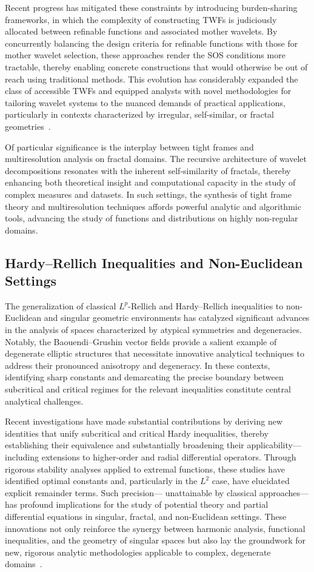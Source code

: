 \documentclass[sigconf]{acmart}
\begin{document}
Recent progress has mitigated these constraints by introducing burden-sharing frameworks, in which the complexity of constructing TWFs is judiciously allocated between refinable functions and associated mother wavelets. By concurrently balancing the design criteria for refinable functions with those for mother wavelet selection, these approaches render the SOS conditions more tractable, thereby enabling concrete constructions that would otherwise be out of reach using traditional methods. This evolution has considerably expanded the class of accessible TWFs and equipped analysts with novel methodologies for tailoring wavelet systems to the nuanced demands of practical applications, particularly in contexts characterized by irregular, self-similar, or fractal geometries~\cite{ref104}.

Of particular significance is the interplay between tight frames and multiresolution analysis on fractal domains. The recursive architecture of wavelet decompositions resonates with the inherent self-similarity of fractals, thereby enhancing both theoretical insight and computational capacity in the study of complex measures and datasets. In such settings, the synthesis of tight frame theory and multiresolution techniques affords powerful analytic and algorithmic tools, advancing the study of functions and distributions on highly non-regular domains.

\subsection{Hardy--Rellich Inequalities and Non-Euclidean Settings}

The generalization of classical $L^p$-Rellich and Hardy--Rellich inequalities to non-Euclidean and singular geometric environments has catalyzed significant advances in the analysis of spaces characterized by atypical symmetries and degeneracies. Notably, the Baouendi--Grushin vector fields provide a salient example of degenerate elliptic structures that necessitate innovative analytical techniques to address their pronounced anisotropy and degeneracy. In these contexts, identifying sharp constants and demarcating the precise boundary between subcritical and critical regimes for the relevant inequalities constitute central analytical challenges.

Recent investigations have made substantial contributions by deriving new identities that unify subcritical and critical Hardy inequalities, thereby establishing their equivalence and substantially broadening their applicability—including extensions to higher-order and radial differential operators. Through rigorous stability analyses applied to extremal functions, these studies have identified optimal constants and, particularly in the $L^2$ case, have elucidated explicit remainder terms. Such precision— unattainable by classical approaches—has profound implications for the study of potential theory and partial differential equations in singular, fractal, and non-Euclidean settings. These innovations not only reinforce the synergy between harmonic analysis, functional inequalities, and the geometry of singular spaces but also lay the groundwork for new, rigorous analytic methodologies applicable to complex, degenerate domains~\cite{ref105}.
\end{document}

